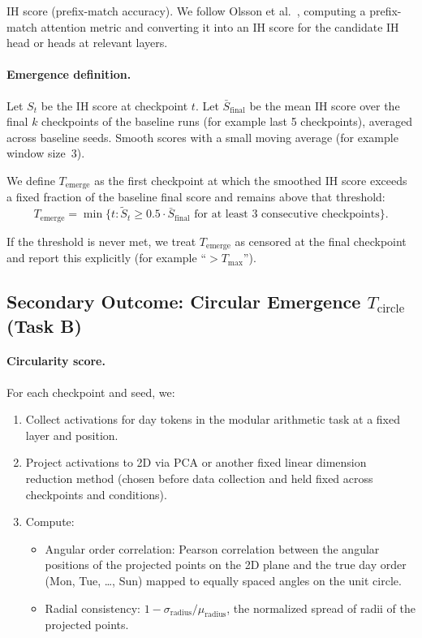 \documentclass[11pt]{article}
\begin{document}
IH score (prefix-match accuracy). We follow Olsson et al.~\cite{olsson2022induction}, computing a prefix-match attention metric and converting it into an IH score for the candidate IH head or heads at relevant layers.

\paragraph{Emergence definition.}
Let $S_t$ be the IH score at checkpoint $t$. Let $\bar{S}_{\text{final}}$ be the mean IH score over the final $k$ checkpoints of the baseline runs (for example last 5 checkpoints), averaged across baseline seeds. Smooth scores with a small moving average (for example window size~3).

We define $T_{\text{emerge}}$ as the first checkpoint at which the smoothed IH score exceeds a fixed fraction of the baseline final score and remains above that threshold:
\[
  T_{\text{emerge}} = \min \{ t : \tilde{S}_t \ge 0.5 \cdot \bar{S}_{\text{final}} \text{ for at least 3 consecutive checkpoints} \}.
\]

If the threshold is never met, we treat $T_{\text{emerge}}$ as censored at the final checkpoint and report this explicitly (for example ``$> T_{\max}$'').

\subsection{Secondary Outcome: Circular Emergence $T_{\text{circle}}$ (Task B)}
\label{sec:circle}

\paragraph{Circularity score.}
For each checkpoint and seed, we:
\begin{enumerate}
  \item Collect activations for day tokens in the modular arithmetic task at a fixed layer and position.
  \item Project activations to 2D via PCA or another fixed linear dimension reduction method (chosen before data collection and held fixed across checkpoints and conditions).
  \item Compute:
    \begin{itemize}
      \item Angular order correlation: Pearson correlation between the angular positions of the projected points on the 2D plane and the true day order (Mon, Tue, \ldots, Sun) mapped to equally spaced angles on the unit circle.
      \item Radial consistency: $1 - \sigma_{\text{radius}} / \mu_{\text{radius}}$, the normalized spread of radii of the projected points.
    \end{itemize}
\end{enumerate}
\end{document}
